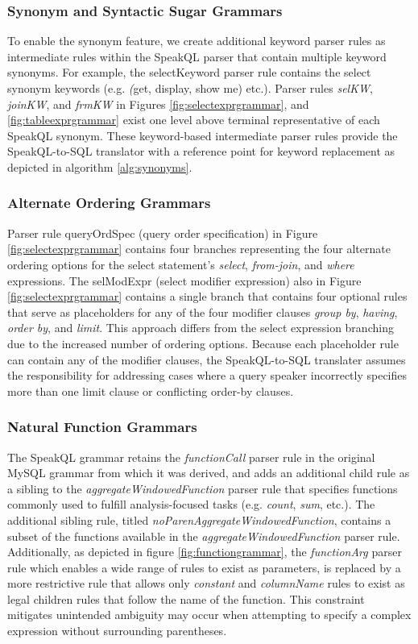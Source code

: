 \subsubsection{Synonym and Syntactic Sugar Grammars}

To enable the synonym feature, we create additional keyword parser rules as intermediate rules within the SpeakQL parser that contain multiple keyword synonyms. For example, the selectKeyword parser rule contains the select synonym keywords (e.g. \emph(get, display, show me) etc.). Parser rules \emph{selKW}, \emph{joinKW}, and \emph{frmKW} in Figures \ref{fig:selectexprgrammar}, and \ref{fig:tableexprgrammar} exist one level above terminal representative of each SpeakQL synonym. These keyword-based intermediate parser rules provide the SpeakQL-to-SQL translator with a reference point for keyword replacement as depicted in algorithm \ref{alg:synonyms}.

\subsubsection{Alternate Ordering Grammars}
Parser rule queryOrdSpec (query order specification) in Figure \ref{fig:selectexprgrammar} contains four branches representing the four alternate ordering options for the select statement's \emph{select}, \emph{from-join}, and \emph{where} expressions. The selModExpr (select modifier expression) also in Figure \ref{fig:selectexprgrammar} contains a single branch that contains four optional rules that serve as placeholders for any of the four modifier clauses \emph{group by}, \emph{having}, \emph{order by}, and \emph{limit}. This approach differs from the select expression branching due to the increased number of ordering options. Because each placeholder rule can contain any of the modifier clauses, the SpeakQL-to-SQL translater assumes the responsibility for addressing cases where a query speaker incorrectly specifies more than one limit clause or conflicting order-by clauses.

\subsubsection{Natural Function Grammars}

The SpeakQL grammar retains the \emph{functionCall} parser rule in the original MySQL grammar from which it was derived, and adds an additional child rule as a sibling to the \emph{aggregateWindowedFunction} parser rule that specifies functions commonly used to fulfill analysis-focused tasks (e.g. \emph{count}, \emph{sum}, etc.). The additional sibling rule, titled \emph{noParenAggregateWindowedFunction}, contains a subset of the functions available in the \emph{aggregateWindowedFunction} parser rule. Additionally, as depicted in figure \ref{fig:functiongrammar}, the \emph{functionArg} parser rule which enables a wide range of rules to exist as parameters, is replaced by a more restrictive rule that allows only \emph{constant} and \emph{columnName} rules to exist as legal children rules that follow the name of the function. This constraint mitigates unintended ambiguity may occur when attempting to specify a complex expression without surrounding parentheses. 

